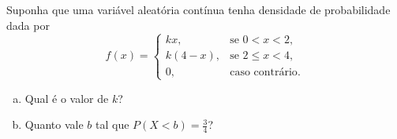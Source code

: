 %
%


\begin{exercicioBanco}[\valorquestao]
Suponha que uma variável aleatória contínua tenha densidade de probabilidade dada por
%
\[
    f(x) = \left\{
    \begin{array}{rl}
        kx, & \text{se } 0 < x < 2, \\
        k(4 - x), & \text{se } 2 \le x < 4, \\
        0, & \text{caso contrário}.
    \end{array}
    \right.
\]
%
\begin{enumerate}[(a)]
    \item Qual é o valor de \(k\)?
    \item Quanto vale \(b\) tal que \(P(X < b) = \frac{3}{4}\)?
\end{enumerate}
%
\end{exercicioBanco}


